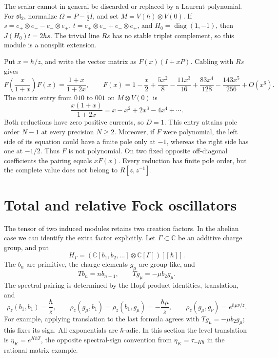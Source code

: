The scalar cannot in general be discarded or replaced by a Laurent
polynomial. For \(\mathfrak{sl}_2\), normalize
\(\Omega=P-\tfrac12I\), and set \(M=V(\hbar)\otimes V(0)\).
If
\(s=e_+\otimes e_--e_-\otimes e_+\),
\(t=e_+\otimes e_-+e_-\otimes e_+\), and
\(H_0=\operatorname{diag}(1,-1)\), then
\(J(H_0)t=2\hbar s\). The trivial line \(Rs\) has no stable
triplet complement, so this module is a nonsplit extension.

Put \(x=\hbar/z\), and write the vector matrix as \(F(x)(I+xP)\).
Cabling with \(Rs\) gives
\[
 F\left(\frac{x}{1+x}\right)F(x)=\frac{1+x}{1+2x},\qquad
 F(x)=1-\frac x2+\frac{5x^2}8-\frac{11x^3}{16}
                       +\frac{83x^4}{128}-\frac{143x^5}{256}+O(x^6).
\]
The matrix entry from \(010\) to \(001\) on \(M\otimes V(0)\) is
\[
 \frac{x(1+x)}{1+2x}=x-x^2+2x^3-4x^4+\cdots.
\]
Both reductions have zero positive currents, so \(D=1\).
This entry attains pole order \(N-1\) at every precision \(N\geq2\).
Moreover, if \(F\) were polynomial, the left side of its equation
could have a finite pole only at \(-1\), whereas the right side
has one at \(-1/2\). Thus \(F\) is not polynomial.
On two fixed opposite off-diagonal coefficients the pairing equals
\(xF(x)\). Every reduction has finite pole order, but the complete
value does not belong to \(R[z,z^{-1}]\).

\section{Total and relative Fock oscillators}
\label{cyrep:sec:relative-fock}

The tensor of two induced modules retains two creation factors.
In the abelian case we can identify the extra factor explicitly.
Let \(\Gamma\subset\mathbb C\) be an additive charge group, and put
\[
 H_\Gamma=(\mathbb C[b_1,b_2,\ldots]\otimes\mathbb C[\Gamma])[[\hbar]].
\]
The \(b_n\) are primitive, the charge elements \(g_\mu\) are
group-like, and
\[
 Tb_n=nb_{n+1},\qquad Tg_\mu=-\mu b_2g_\mu.
\]
The spectral pairing is determined by the Hopf product identities,
translation, and
\begin{equation}\label{cyrep:eq:charged-spectral-pairing}
 \rho_z(b_1,b_1)=\frac\hbar z,\qquad
 \rho_z(g_\mu,b_1)=\rho_z(b_1,g_\mu)=-\frac{\hbar\mu}{z},
 \qquad \rho_z(g_\mu,g_\nu)=e^{\hbar\mu\nu/z}.
\end{equation}
For example, applying translation to the last formula agrees
with \(Tg_\mu=-\mu b_2g_\mu\); this fixes its sign.
All exponentials are \(\hbar\)-adic.
In this section the level translation is
\(\eta_K=e^{K\hbar T}\), the opposite spectral-sign convention
from \(\eta_K=\tau_{-K\hbar}\) in the rational matrix example.


